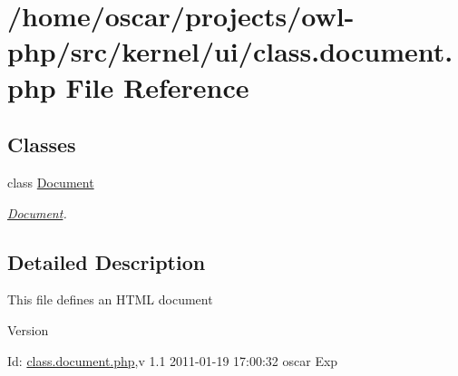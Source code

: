 \section{/home/oscar/projects/owl-\/php/src/kernel/ui/class.document.php File Reference}
\label{class_8document_8php}
\subsection*{Classes}
\begin{DoxyCompactItemize}
\item 
class \hyperlink{classDocument}{Document}
\begin{DoxyCompactList}\small\item\em \hyperlink{classDocument}{Document}. \item\end{DoxyCompactList}\end{DoxyCompactItemize}


\subsection{Detailed Description}
This file defines an HTML document \begin{DoxyVersion}{Version}

\end{DoxyVersion}
\begin{DoxyParagraph}{Id:}
\hyperlink{class_8document_8php}{class.document.php},v 1.1 2011-\/01-\/19 17:00:32 oscar Exp 
\end{DoxyParagraph}
